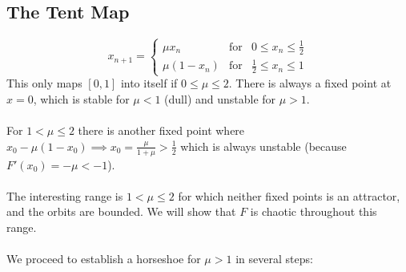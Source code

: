 \documentclass{article}
\begin{document}
\subsection{The Tent Map}
\[ x_{n+1} = \left\{ \begin{array}{ccc} 
\mu x_n & \mbox{for} & 0 \leq x_n \leq \frac{1}{2} \\
\mu (1-x_n) & \mbox{for} & \frac{1}{2} \leq x_n \leq 1
\end{array} \right. \]
This only maps $[0,1]$ into itself if $0 \leq \mu \leq 2$. There is always a
fixed point at $x=0$, which is stable for $\mu < 1$ (dull) and unstable
for $\mu >1$.
\\
\\
For $1 < \mu \leq 2$ there is another fixed point where 
$\displaystyle x_0 - \mu(1-x_0) \implies x_0 = \frac{\mu}{1+\mu} > \frac{1}{2}$
which is always unstable (because $F'(x_0)=-\mu < -1$).
\\
\\
The interesting range is $1<\mu\leq 2$ for which neither fixed points is an
attractor, and the orbits are bounded. We will show that $F$ is chaotic 
throughout this range.
\\
\\
We proceed to establish a horseshoe for $\mu>1$ in several steps:
\end{document}

